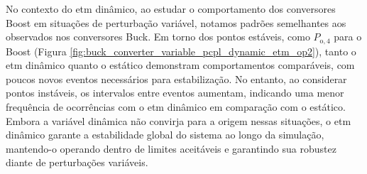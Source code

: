 No contexto do \acrshort{etm} dinâmico, ao estudar o comportamento dos conversores Boost em situações de perturbação variável, notamos padrões semelhantes aos observados nos conversores Buck. Em torno dos pontos estáveis, como $P_{\mathrm{o}, 4}$ para o Boost (Figura \ref{fig:buck_converter_variable_pcpl_dynamic_etm_op2}), tanto o \acrshort{etm} dinâmico quanto o estático demonstram comportamentos comparáveis, com poucos novos eventos necessários para estabilização. No entanto, ao considerar pontos instáveis, os intervalos entre eventos aumentam, indicando uma menor frequência de ocorrências com o \acrshort{etm} dinâmico em comparação com o estático. Embora a variável dinâmica não convirja para a origem nessas situações, o \acrshort{etm} dinâmico garante a estabilidade global do sistema ao longo da simulação, mantendo-o operando dentro de limites aceitáveis e garantindo sua robustez diante de perturbações variáveis.

